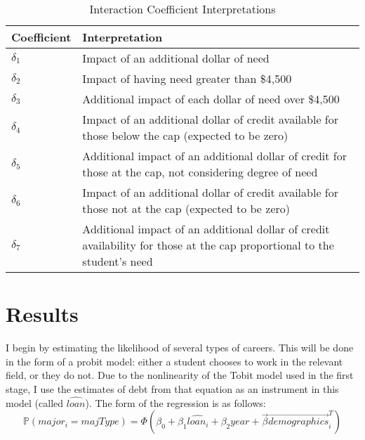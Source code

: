 \documentclass[12pt]{article}
\begin{document}
	\begin{table}
		\centering
		\caption{Interaction Coefficient Interpretations}		
		\begin{tabular}{lp{8cm}}
			\toprule
			Coefficient & Interpretation\\
			\midrule
			$\delta_1$ & Impact of an additional dollar of need\\
			$\delta_2$ & Impact of having need greater than \$4,500 \\
			$\delta_3$ & Additional impact of each dollar of need over \$4,500 \\
			$\delta_4$ & Impact of an additional dollar of credit available for those below the cap (expected to be zero)\\
			$\delta_5$ & Additional impact of an additional dollar of credit for those at the cap, not considering degree of need\\
			$\delta_6$ & Impact of an additional dollar of credit available for those not at the cap (expected to be zero)\\
			$\delta_7$ & Additional impact of an additional dollar of credit availability for those at the cap proportional to the student's need \\
			\bottomrule
		\end{tabular}
	
		\label{coefInterp}
	\end{table}
	
	
	\section{Results}
	
	I begin by estimating the likelihood of several types of careers. This will be done in the form of a probit model: either a student chooses to work in the relevant field, or they do not. Due to the nonlinearity of the Tobit model used in the first stage, I use the estimates of debt from that equation as an instrument in this model (called $\hat{loan}$). The form of the regression is as follows: 
	\begin{equation}
	\mathbb{P}\left(major_i = majType\right) = \Phi\left(\beta_0 + \beta_1 \hat{loan_i} + \beta_2 year + \vec{\beta}\vec{demographics}^T_i\right)
	\end{equation}
	
\end{document}
